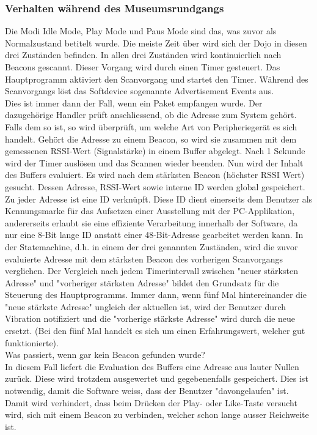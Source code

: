 \subsubsection{Verhalten während des Museumsrundgangs}
Die Modi Idle Mode, Play Mode und Paus Mode sind das, was zuvor als Normalzustand betitelt wurde. Die meiste Zeit über wird sich der Dojo in diesen drei Zuständen befinden.
In allen drei Zuständen wird kontinuierlich nach Beacons gescannt. Dieser Vorgang wird durch einen Timer gesteuert. Das Hauptprogramm aktiviert den Scanvorgang und startet den Timer. Während des Scanvorgangs löst das Softdevice sogenannte Advertisement Events aus.\\ Dies ist immer dann der Fall, wenn ein Paket empfangen wurde. Der dazugehörige Handler prüft anschliessend, ob die Adresse zum System gehört. Falls dem so ist, so wird überprüft, um welche Art von Peripheriegerät es sich handelt. Gehört die Adresse zu einem Beacon, so wird sie zusammen mit dem gemessenen RSSI-Wert (Signalstärke) in einem Buffer abgelegt. Nach 1 Sekunde wird der Timer auslösen und das Scannen wieder beenden. Nun wird der Inhalt des Buffers evaluiert. Es wird nach dem stärksten Beacon (höchster RSSI Wert) gesucht. Dessen Adresse, RSSI-Wert sowie interne ID werden global gespeichert.\\ Zu jeder Adresse ist eine ID verknüpft. Diese ID dient einerseits dem Benutzer als Kennungsmarke für das Aufsetzen einer Ausstellung mit der PC-Applikation, andererseits erlaubt sie eine effiziente Verarbeitung innerhalb der Software, da nur eine 8-Bit lange ID anstatt einer 48-Bit-Adresse gearbeitet werden kann.
In der Statemachine, d.h. in einem der drei genannten Zuständen, wird die zuvor evaluierte Adresse mit dem stärksten Beacon des vorherigen Scanvorgangs verglichen. Der Vergleich nach jedem Timerintervall zwischen "neuer stärksten Adresse" und "vorheriger stärksten Adresse" bildet den Grundsatz für die Steuerung des Hauptprogramms. Immer dann, wenn fünf Mal hintereinander die "neue stärkste Adresse" ungleich der aktuellen ist, wird der Benutzer durch Vibration notifiziert und die "vorherige stärkste Adresse" wird durch die neue ersetzt. (Bei den fünf Mal handelt es sich um einen Erfahrungswert, welcher gut funktionierte).\\
Was passiert, wenn gar kein Beacon gefunden wurde? \\In diesem Fall liefert die Evaluation des Buffers eine Adresse aus lauter Nullen zurück. Diese wird trotzdem ausgewertet und gegebenenfalls gespeichert. Dies ist notwendig, damit die Software weiss, dass der Benutzer "davongelaufen" ist. Damit wird verhindert, dass beim Drücken der Play- oder Like-Taste versucht wird, sich mit einem Beacon zu verbinden, welcher schon lange ausser Reichweite ist.
